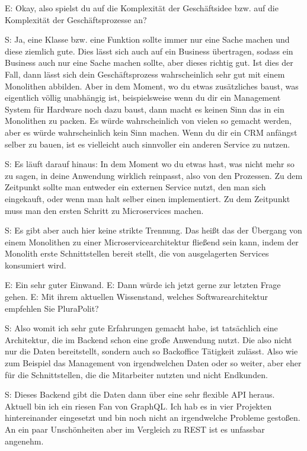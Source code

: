 E: Okay, also spielst du auf die Komplexität der Geschäftsidee bzw. auf die Komplexität der Geschäftsprozesse an?

S: Ja, eine Klasse bzw. eine Funktion sollte immer nur eine Sache machen und diese ziemlich gute. Dies lässt sich auch auf ein Business übertragen, sodass ein Business auch nur eine Sache machen sollte, aber dieses richtig gut. Ist dies der Fall, dann lässt sich dein Geschäftsprozess wahrscheinlich sehr gut mit einem Monolithen abbilden. Aber in dem Moment, wo du etwas zusätzliches baust, was eigentlich völlig unabhängig ist, beispielsweise wenn du dir ein Management System für Hardware noch dazu baust, dann macht es keinen Sinn das in ein Monolithen zu packen. Es würde wahrscheinlich von vielen so gemacht werden, aber es würde  wahrscheinlich kein Sinn machen. Wenn du dir ein CRM anfängst selber zu bauen, ist es vielleicht auch sinnvoller ein anderen Service zu nutzen.

S: Es läuft darauf hinaus: In dem Moment wo du etwas hast, was nicht mehr so zu sagen, in deine Anwendung wirklich reinpasst, also von den Prozessen. Zu dem Zeitpunkt sollte man entweder ein externen Service nutzt, den man sich eingekauft, oder wenn man halt selber einen implementiert. Zu dem Zeitpunkt muss man den ersten Schritt zu Microservices machen. 

S: Es gibt aber auch hier keine strikte Trennung. Das heißt das der Übergang von einem Monolithen zu einer Microservicearchitektur fließend sein kann, indem der Monolith erste Schnittstellen bereit stellt, die von ausgelagerten Services konsumiert wird.


E: Ein sehr guter Einwand.
E: Dann würde ich jetzt gerne zur letzten Frage gehen.
E: Mit ihrem aktuellen Wissenstand, welches Softwarearchitektur empfehlen Sie PluraPolit?

S:  Also womit ich sehr gute Erfahrungen gemacht habe, ist tatsächlich eine Architektur, die im Backend schon eine große Anwendung nutzt. Die also nicht nur die Daten bereitstellt, sondern auch so Backoffice Tätigkeit zulässt. Also wie zum Beispiel das Management von irgendwelchen Daten oder so weiter, aber eher für die Schnittstellen, die die Mitarbeiter nutzten und nicht Endkunden.

S: Dieses Backend gibt die Daten dann über eine sehr flexible API heraus. Aktuell bin ich ein riesen Fan von GraphQL. Ich hab es in vier Projekten hintereinander eingesetzt und bin noch nicht an irgendwelche Probleme gestoßen. An ein paar Unschönheiten aber im Vergleich zu REST ist es unfassbar angenehm. 

